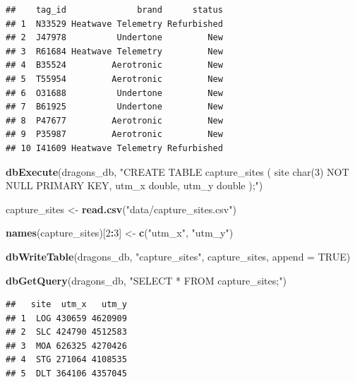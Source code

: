 \documentclass[
]{book}
\newenvironment{Shaded}{\begin{snugshade}}{\end{snugshade}}
\newcommand{\AttributeTok}[1]{\textcolor[rgb]{0.13,0.29,0.53}{#1}}
\newcommand{\ConstantTok}[1]{\textcolor[rgb]{0.56,0.35,0.01}{#1}}
\newcommand{\DecValTok}[1]{\textcolor[rgb]{0.00,0.00,0.81}{#1}}
\newcommand{\FunctionTok}[1]{\textcolor[rgb]{0.13,0.29,0.53}{\textbf{#1}}}
\newcommand{\NormalTok}[1]{#1}
\newcommand{\OtherTok}[1]{\textcolor[rgb]{0.56,0.35,0.01}{#1}}
\newcommand{\SpecialCharTok}[1]{\textcolor[rgb]{0.81,0.36,0.00}{\textbf{#1}}}
\newcommand{\StringTok}[1]{\textcolor[rgb]{0.31,0.60,0.02}{#1}}
\begin{document}
\begin{verbatim}
##    tag_id              brand      status
## 1  N33529 Heatwave Telemetry Refurbished
## 2  J47978          Undertone         New
## 3  R61684 Heatwave Telemetry         New
## 4  B35524         Aerotronic         New
## 5  T55954         Aerotronic         New
## 6  O31688          Undertone         New
## 7  B61925          Undertone         New
## 8  P47677         Aerotronic         New
## 9  P35987         Aerotronic         New
## 10 I41609 Heatwave Telemetry Refurbished
\end{verbatim}

\begin{Shaded}
\begin{Highlighting}[]
\FunctionTok{dbExecute}\NormalTok{(dragons\_db, }\StringTok{"CREATE TABLE capture\_sites (}
\StringTok{site char(3) NOT NULL PRIMARY KEY,}
\StringTok{utm\_x double,}
\StringTok{utm\_y double}
\StringTok{);"}\NormalTok{)}
\end{Highlighting}
\end{Shaded}

\begin{Shaded}
\begin{Highlighting}[]
\NormalTok{capture\_sites }\OtherTok{\textless{}{-}} \FunctionTok{read.csv}\NormalTok{(}\StringTok{"data/capture\_sites.csv"}\NormalTok{)}

\FunctionTok{names}\NormalTok{(capture\_sites)[}\DecValTok{2}\SpecialCharTok{:}\DecValTok{3}\NormalTok{] }\OtherTok{\textless{}{-}} \FunctionTok{c}\NormalTok{(}\StringTok{"utm\_x"}\NormalTok{, }\StringTok{"utm\_y"}\NormalTok{)}

\FunctionTok{dbWriteTable}\NormalTok{(dragons\_db, }\StringTok{"capture\_sites"}\NormalTok{, capture\_sites, }\AttributeTok{append =} \ConstantTok{TRUE}\NormalTok{)}
\end{Highlighting}
\end{Shaded}

\begin{Shaded}
\begin{Highlighting}[]
\FunctionTok{dbGetQuery}\NormalTok{(dragons\_db, }\StringTok{"SELECT * FROM capture\_sites;"}\NormalTok{)}
\end{Highlighting}
\end{Shaded}

\begin{verbatim}
##   site  utm_x   utm_y
## 1  LOG 430659 4620909
## 2  SLC 424790 4512583
## 3  MOA 626325 4270426
## 4  STG 271064 4108535
## 5  DLT 364106 4357045
\end{verbatim}
\end{document}
